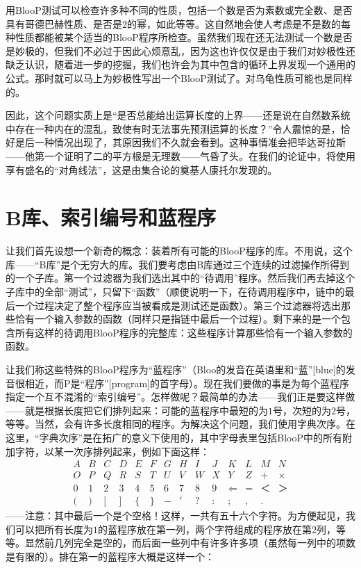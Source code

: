 用BlooP测试可以检查许多种不同的性质，包括一个数是否为素数或完全数、是否具有哥德巴赫性质、是否是$2$的幂，如此等等。这自然地会使人考虑是不是数的每种性质都能被某个适当的BlooP程序所检查。虽然我们现在还无法测试一个数是否是妙极的，但我们不必过于因此心烦意乱，因为这也许仅仅是由于我们对妙极性还缺乏认识，随着进一步的挖掘，我们也许会为其中包含的循环上界发现一个通用的公式。那时就可以马上为妙极性写出一个BlooP测试了。对乌龟性质可能也是同样的。

因此，这个问题实质上是“是否总能给出运算长度的上界——还是说在自然数系统中存在一种内在的混乱，致使有时无法事先预测运算的长度？”令人震惊的是，恰好是后一种情况出现了，其原因我们不久就会看到。这种事情准会把毕达哥拉斯——他第一个证明了二的平方根是无理数——气昏了头。在我们的论证中，将使用享有盛名的“对角线法”，这是由集合论的奠基人康托尔发现的。

\section{B库、索引编号和蓝程序}

让我们首先设想一个新奇的概念：装着所有可能的BlooP程序的库。不用说，这个库——“B库”是个无穷大的库。我们要考虑由B库通过三个连续的过滤操作所得到的一个子库。第一个过滤器为我们选出其中的“待调用”程序。然后我们再去掉这个子库中的全部“测试”，只留下“函数”（顺便说明一下，在待调用程序中，链中的最后一个过程决定了整个程序应当被看成是测试还是函数）。第三个过滤器将选出那些恰有一个输入参数的函数（同样只是指链中最后一个过程）。剩下来的是一个包含所有这样的待调用BlooP程序的完整库：这些程序计算那些恰有一个输入参数的函数。

让我们称这些特殊的BlooP程序为“蓝程序”（Bloo的发音在英语里和“蓝”[blue]的发音很相近，而P是“程序”[program]的首字母）。现在我们要做的事是为每个蓝程序指定一个互不混淆的“索引编号”。怎样做呢？最简单的办法——我们正是要这样做——就是根据长度把它们排列起来：可能的蓝程序中最短的为$1$号，次短的为$2$号，等等。当然，会有许多长度相同的程序。为解决这个问题，我们使用字典次序。在这里，“字典次序”是在拓广的意义下使用的，其中字母表里包括BlooP中的所有附加字符，以某一次序排列起来，例如下面这样：
\[
\begin{array}{*{14}{c}}
A&B&C&D&E&F&G&H&I&J&K&L&M&N \\
O&P&Q&R&S&T&U&V&W&X&Y&Z&+&\times \\
0&1&2&3&4&5&6&7&8&9&\Leftarrow&=&＜&＞ \\
(&)&[&]&\{&\}&-&'&?&:&;&,&.&
\end{array}
\]
——注意：其中最后一个是个空格！这样，一共有五十六个字符。为方便起见，我们可以把所有长度为$1$的蓝程序放在第一列，两个字符组成的程序放在第$2$列，等等。显然前几列完全是空的，而后面一些列中有许多许多项（虽然每一列中的项数是有限的）。排在第一的蓝程序大概是这样一个：

